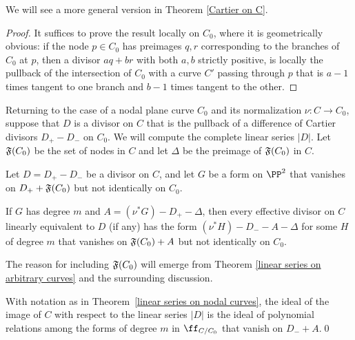 We will see a more general version in Theorem \ref{Cartier on C}.

\begin{proof}
It suffices to prove the result locally on $C_{0}$, where it is
geometrically obvious:  if the node
$p\in C_{0}$ has preimages $q,r$ corresponding to the branches of $C_{0}$
at $p$, then
a divisor $aq+br$ with both $a,b$ strictly positive, is locally the
pullback of the intersection of $C_{0}$
with a curve $C'$ passing through $p$  that is $a{-}1$ times tangent to
one branch and
$b{-}1$ times tangent to the other.
\end{proof}


Returning to the case of a nodal plane curve $C_{0}$ and its normalization
$\nu: C\to C_{0}$,
suppose that $D$ is a divisor on $C$ that is the pullback of a difference
of Cartier
divisors $D_{+}-D_{-}$ on $C_{0}$. We will compute the complete linear
series $|D|$.
Let $\adj(C_{0})$ be the set of nodes in $C$ and let $\Delta$ be the
preimage of $\adj(C_{0})$ in $C$.

\begin{theorem}\label{linear series on nodal curves}
Let $D = D_{+}-D_{-}$ be a divisor on $C$, and let $G$ be a form on
$\PP^{2}$
that vanishes on  $D_{+}+\adj(C_{0})$ but not identically on $C_{0}$.

If $G$ has degree $m$ and $A = (\nu^{*}G)-D_{+}-\Delta$, then every
effective divisor on
$C$ linearly equivalent to $D$ (if any) has the form
$(\nu^*H)-D_{-}-A-\Delta$ for some $H$ of degree $m$
that vanishes on $\adj(C_{0})+A$ but not identically on $C_{0}$.
\unif
\end{theorem}

The reason for including $\adj(C_{0})$ will emerge from
Theorem \ref{linear series on arbitrary curves} and the surrounding discussion.

\begin{corollary}
With notation as in Theorem~\ref{linear series on nodal curves}, the
ideal of the image of
$C$ with respect to the linear series $|D|$ is the ideal of polynomial
relations among the forms
of degree $m$ in $\ff_{C/C_{0}}$ that vanish on $D_{-}+ A$.\qed
\unif
\end{corollary}


